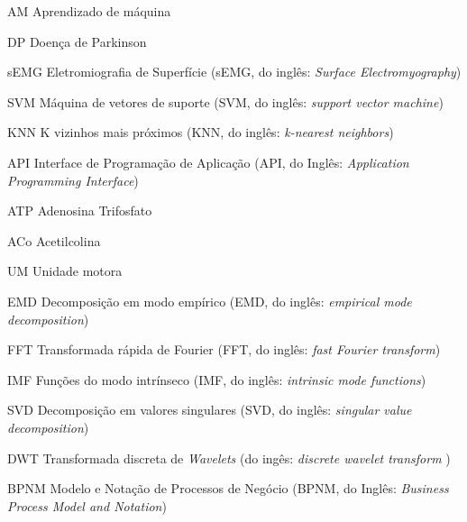 \begin{siglas}
  \item[AM] Aprendizado de máquina
  \item[DP] Doença de Parkinson
  \item[sEMG] Eletromiografia de Superfície (sEMG, do inglês: \textit{Surface Electromyography})
  \item[SVM] Máquina de vetores de suporte (SVM, do inglês: \textit{support vector machine}) 
  \item[KNN] K vizinhos mais próximos (KNN, do inglês: \textit{k-nearest neighbors}) 
  \item[API] Interface de Programação de Aplicação (API, do Inglês: \textit{Application Programming Interface})
  \item[ATP] Adenosina Trifosfato
  \item[ACo] Acetilcolina
  \item[UM] Unidade motora
  \item[EMD] Decomposição em modo empírico (EMD, do inglês: \textit{empirical mode decomposition})
  \item[FFT] Transformada rápida de Fourier (FFT, do inglês: \textit{fast Fourier transform}) 
  \item[IMF] Funções do modo intrínseco (IMF, do inglês: \textit{intrinsic mode functions})
  \item[SVD] Decomposição em valores singulares (SVD, do inglês: \textit{singular value decomposition})
  \item[DWT] Transformada discreta de \textit{Wavelets} (do ingês: \textit{discrete wavelet transform })
  \item[BPNM] Modelo e Notação de Processos de Negócio (BPNM, do Inglês: \textit{Business Process Model and Notation})
\end{siglas}
